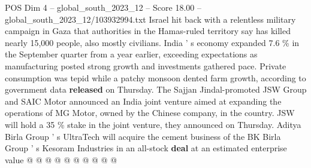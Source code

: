 \begin{textsample}{POS Dim 4 – global\_south\_2023\_12 – Score 18.00 – global\_south\_2023\_12/103932994.txt}
Israel hit back with a relentless military campaign in Gaza that authorities in the Hamas-ruled territory say has killed nearly 15,000 people, also mostly civilians.
India ' s economy expanded 7.6 \% in the September quarter from a year earlier, exceeding expectations as manufacturing posted strong growth and investments gathered pace.
Private consumption was tepid while a patchy monsoon dented farm growth, according to government data \textbf{released} on Thursday.
The Sajjan Jindal-promoted JSW Group and SAIC Motor announced an India joint venture aimed at expanding the operations of MG Motor, owned by the Chinese company, in the country.
JSW will hold a 35 \% stake in the joint venture, they announced on Thursday.
Aditya Birla Group ' s UltraTech will acquire the cement business of the BK Birla Group ' s Kesoram Industries in an all-stock \textbf{deal} at an estimated enterprise value @ @ @ @ @ @ @ @ @ @

\end{textsample}
